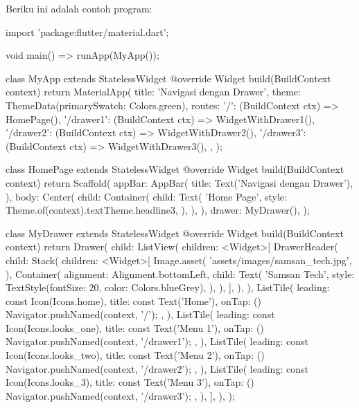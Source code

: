 \documentclass[a4paper,11pt]{article} %
\begin{document}
Beriku ini adalah contoh program:
\begin{dartcode}
import 'package:flutter/material.dart';

void main() => runApp(MyApp());
  
class MyApp extends StatelessWidget {
  @override
  Widget build(BuildContext context) {
    return MaterialApp(
      title: 'Navigasi dengan Drawer',
      theme: ThemeData(primarySwatch: Colors.green),
      routes: {
        '/': (BuildContext ctx) => HomePage(),
        '/drawer1': (BuildContext ctx) => WidgetWithDrawer1(),
        '/drawer2': (BuildContext ctx) => WidgetWithDrawer2(),
        '/drawer3': (BuildContext ctx) => WidgetWithDrawer3(),
      },
    );
  }
}
  
class HomePage extends StatelessWidget {
  @override
  Widget build(BuildContext context) {
    return Scaffold(
      appBar: AppBar(
        title: Text('Navigasi dengan Drawer'),
      ),
      body: Center(
        child: Container(
          child: Text(
            'Home Page',
            style: Theme.of(context).textTheme.headline3,
          ),
        ),
      ),
      drawer: MyDrawer(),
    );
  }
}
  
class MyDrawer extends StatelessWidget {
  @override
  Widget build(BuildContext context) {
    return Drawer(
      child: ListView(
        children: <Widget>[
          DrawerHeader(
            child: Stack(
              children: <Widget>[
                Image.asset(
                  'assets/images/samsan_tech.jpg',
                ),
                Container(
                  alignment: Alignment.bottomLeft,
                  child: Text(
                    'Samsan Tech',
                    style: TextStyle(fontSize: 20, color: Colors.blueGrey),
                  ),
                ),
              ],
            ),
          ),
          ListTile(
            leading: const Icon(Icons.home),
            title: const Text('Home'),
            onTap: () {
              Navigator.pushNamed(context, '/');
            },
          ),
          ListTile(
            leading: const Icon(Icons.looks_one),
            title: const Text('Menu 1'),
            onTap: () {
              Navigator.pushNamed(context, '/drawer1');
            },
          ),
          ListTile(
            leading: const Icon(Icons.looks_two),
            title: const Text('Menu 2'),
            onTap: () {
              Navigator.pushNamed(context, '/drawer2');
            },
          ),
          ListTile(
            leading: const Icon(Icons.looks_3),
            title: const Text('Menu 3'),
            onTap: () {
              Navigator.pushNamed(context, '/drawer3');
            },
          ),
        ],
      ),
    );
  }
}
  

\end{dartcode}
\end{document}
